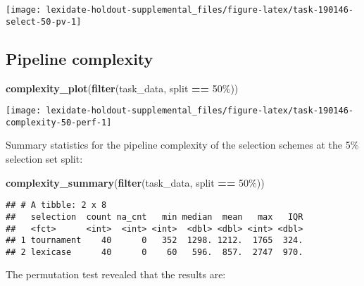 \documentclass[
]{book}
\newenvironment{Shaded}{\begin{snugshade}}{\end{snugshade}}
\newcommand{\FunctionTok}[1]{\textcolor[rgb]{0.13,0.29,0.53}{\textbf{#1}}}
\newcommand{\NormalTok}[1]{#1}
\newcommand{\SpecialCharTok}[1]{\textcolor[rgb]{0.81,0.36,0.00}{\textbf{#1}}}
\newcommand{\StringTok}[1]{\textcolor[rgb]{0.31,0.60,0.02}{#1}}
\begin{document}
\texttt{[image: lexidate-holdout-supplemental\_files/figure-latex/task-190146-select-50-pv-1]}

\hypertarget{pipeline-complexity-16}{%
\subsection{Pipeline complexity}\label{pipeline-complexity-16}}

\begin{Shaded}
\begin{Highlighting}[]
\FunctionTok{complexity\_plot}\NormalTok{(}\FunctionTok{filter}\NormalTok{(task\_data, split }\SpecialCharTok{==} \StringTok{\textquotesingle{}50\%\textquotesingle{}}\NormalTok{))}
\end{Highlighting}
\end{Shaded}

\texttt{[image: lexidate-holdout-supplemental\_files/figure-latex/task-190146-complexity-50-perf-1]}

Summary statistics for the pipeline complexity of the selection schemes at the 5\% selection set split:

\begin{Shaded}
\begin{Highlighting}[]
\FunctionTok{complexity\_summary}\NormalTok{(}\FunctionTok{filter}\NormalTok{(task\_data, split }\SpecialCharTok{==} \StringTok{\textquotesingle{}50\%\textquotesingle{}}\NormalTok{))}
\end{Highlighting}
\end{Shaded}

\begin{verbatim}
## # A tibble: 2 x 8
##   selection  count na_cnt   min median  mean   max   IQR
##   <fct>      <int>  <int> <int>  <dbl> <dbl> <int> <dbl>
## 1 tournament    40      0   352  1298. 1212.  1765  324.
## 2 lexicase      40      0    60   596.  857.  2747  970.
\end{verbatim}

The permutation test revealed that the results are:
\end{document}
